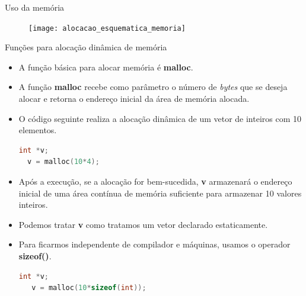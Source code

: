 \begin{frame}[plain,c]{Uso da memória}  
  \begin{figure}[ht]
      \centering
      \texttt{[image: alocacao\_esquematica\_memoria]}
  \end{figure}
\end{frame}

\begin{frame}{Funções para alocação dinâmica de memória}
  \begin{itemize}[<+->]
    \item A função básica para alocar memória é \textbf{malloc}.
    \item A função \textbf{malloc} recebe como parâmetro o número de \textit{bytes} que se deseja alocar e retorna o endereço inicial da área de memória alocada. 
    \item O código seguinte realiza a alocação dinâmica de um vetor de inteiros com 10 elementos.
\begin{lstlisting}[language=C]
  int *v;
  v = malloc(10*4);
\end{lstlisting}
      \item Após a execução, se a alocação for bem-sucedida, \textbf{v} armazenará o endereço inicial de uma área contínua de memória suficiente para armazenar 10 valores inteiros.
      \item Podemos tratar \textbf{v} como tratamos um vetor declarado estaticamente.
      \item Para ficarmos independente de compilador e máquinas, usamos o operador \textbf{sizeof()}. 
\begin{lstlisting}[language=C]
   int *v;
   v = malloc(10*sizeof(int));
\end{lstlisting}
  \end{itemize}
\end{frame}

